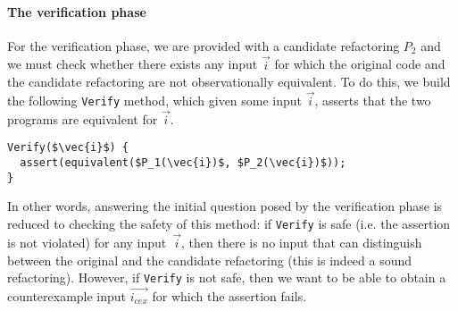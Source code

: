\documentclass[sigconf,review,anonymous]{acmart}
\begin{document}


\paragraph{The verification phase} For the verification phase, we are provided with a candidate
refactoring $P_2$ and we must check whether there exists any input
$\vec{i}$ for which the original code and the candidate
refactoring are not observationally equivalent.  To do this, we build
the following \texttt{Verify} method, which given some input
$\vec{i}$, asserts that the two programs are equivalent for
$\vec{i}$.

\begin{lstlisting}[mathescape=true,showstringspaces=false]
Verify($\vec{i}$) {
  assert(equivalent($P_1(\vec{i})$, $P_2(\vec{i})$));
}
\end{lstlisting}

In other words, answering the initial question posed by the verification
phase is reduced to checking the safety of this method: if
\texttt{Verify} is safe (i.e. the assertion is not violated) for any
input~$\vec{i}$, then there is no input that can distinguish
between the original and the candidate refactoring (this
is indeed a sound refactoring). However, if \texttt{Verify} is not safe,
then we want to be able to obtain a counterexample input
$\vec{i_{cex}}$ for which the assertion fails.
\end{document}
